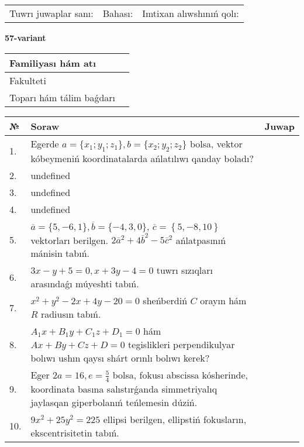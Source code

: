 \documentclass{article}
\begin{document}
\vspace{0.7cm}

\begin{tabular}{lll}
Tuwrı juwaplar sanı: \underline{\hspace{1cm}} & 
Bahası: \underline{\hspace{1cm}} & 
Imtixan alıwshınıń qolı: \underline{\hspace{2cm}} \\
\end{tabular}

\egroup

\newpage


\textbf{57-variant}\\

\bgroup
\def\arraystretch{1.6} %

\begin{tabular}{|m{5.7cm}|m{9.5cm}|}
\hline
Familiyası hám atı & \\
\hline
Fakulteti  & \\
\hline
Toparı hám tálim baǵdarı  & \\
\hline
\end{tabular}

\vspace{0.7cm}

\begin{tabular}{|m{0.7cm}|m{10cm}|m{4cm}|}
\hline
№ & Soraw & Juwap \\
\hline
1. & Egerde \(a = \{ x_{1}; y_{1}; z_{1}\}, b = \{ x_{2}; y_{2}; z_{2}\}\) bolsa, vektor kóbeymeniń koordinatalarda ańlatılıwı qanday boladı? &  \\
\hline
2. & undefined &  \\
\hline
3. & undefined &  \\
\hline
4. & undefined &  \\
\hline
5. & \(\overline{a} = \{5,- 6, 1 \}, \overline{b} = \{ - 4, 3, 0 \} \), \(\overline{c} = \left\{ 5,- 8, 10 \right\}\) vektorları berilgen. \(2{\bar{a}}^{2} + 4{\bar{b}}^{2} - 5{\bar{c}}^{2}\) ańlatpasınıń mánisin tabıń. &  \\
\hline
6. & \(3 x - y + 5 = 0, x + 3 y - 4 = 0\) tuwrı sızıqları arasındaǵı múyeshti tabıń. &  \\
\hline
7. & \(x^{2} + y^{2} - 2 x + 4 y - 20 = 0\) sheńberdiń \(C\) orayın hám \(R\) radiusın tabıń. &  \\
\hline
8. & \(A_{1}x + B_{1}y + C_{1}z + D_{1} = 0\) hám \(Ax + By + Cz + D = 0\) tegislikleri perpendikulyar bolıwı ushın qaysı shárt orınlı bolıwı kerek? &  \\
\hline
9. & Eger \(2 a = 16, e = \frac{5}{4}\) bolsa, fokusı abscissa kósherinde, koordinata basına salıstırǵanda simmetriyalıq jaylasqan giperbolanıń teńlemesin dúziń. &  \\
\hline
10. & \(9 x^{2} + 25 y^{2} = 225\) ellipsi berilgen, ellipstiń fokusların, ekscentrisitetin tabıń. & \\
\hline
\end{tabular}
\end{document}
